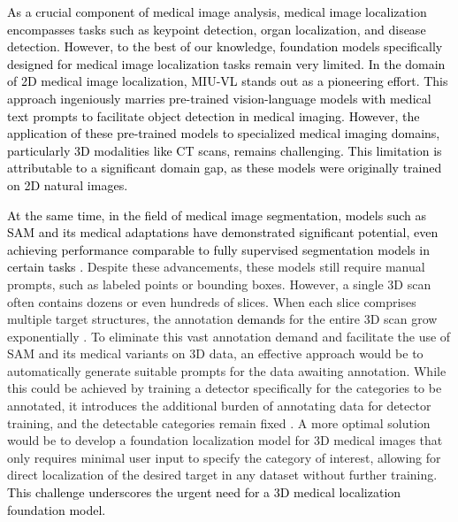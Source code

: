 \documentclass[times,twocolumn,final]{elsarticle}
\begin{document}
\par \textcolor{black}{As a crucial component of medical image analysis, medical image localization encompasses tasks such as keypoint detection\citep{chen2021fast, wan2023multi}, organ localization\citep{xu2019efficient,navarro2020deep, hussain2021cascaded, navarro2022unified}, and disease detection\citep{yan2018deeplesion, zhang2018automatic}. However, to the best of our knowledge, foundation models specifically designed for medical image localization tasks remain very limited.  In the domain of 2D medical image localization, MIU-VL \citep{qin2022medical} stands out as a pioneering effort.  This approach ingeniously marries pre-trained vision-language models with medical text prompts to facilitate object detection in medical imaging. However, the application of these pre-trained models to specialized medical imaging domains, particularly 3D modalities like CT scans, remains challenging. This limitation is attributable to a significant domain gap, as these models were originally trained on 2D natural images.}

\par \textcolor{black}{At the same time, in the field of medical image segmentation,  models such as SAM and its medical adaptations \citep{MSA, cheng2023sam, he2023sam, huang2023segment, he2023accuracy, zhang2023customized, mazurowski2023segment, zhang2023segment} have demonstrated significant potential, even achieving performance comparable to fully supervised segmentation models in certain tasks \citep{MedSAM}.} Despite these advancements, these models still require manual prompts, such as labeled points or bounding boxes. However, a single 3D scan often contains dozens or even hundreds of slices. When each slice comprises multiple target structures, the annotation \textcolor{black}{demands} for the entire 3D scan grow exponentially \citep{wang2018deepigeos, lei2019deepigeos}. To eliminate this vast annotation demand and facilitate the use of SAM and its medical variants on 3D data, an effective approach would be to automatically generate suitable prompts for the data awaiting annotation. While this could be achieved by training a detector specifically for the categories to be annotated, it introduces the additional burden of annotating data for detector training, and the detectable categories remain fixed \citep{baumgartner2021nndetection}. A more optimal solution would be to develop a foundation localization model for 3D medical images that only requires minimal user input to specify the category of interest, allowing for direct localization of the desired target in any dataset without further training. \textcolor{black}{This challenge underscores the urgent need for a 3D medical localization foundation model.}
\end{document}
